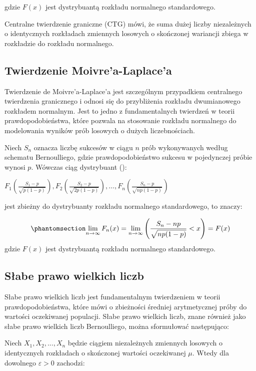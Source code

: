 \documentclass[
  letterpaper,
  DIV=11,
  numbers=noendperiod]{scrreprt}
\begin{document}
gdzie \(F(x)\) jest dystrybuantą rozkładu normalnego standardowego.

Centralne twierdzenie graniczne (CTG) mówi, że suma dużej liczby
niezależnych o identycznych rozkładach zmiennych losowych o skończonej
wariancji zbiega w rozkładzie do rozkładu normalnego.

\subsection{Twierdzenie
Moivre'a-Laplace'a}\label{twierdzenie-moivrea-laplacea}

Twierdzenie de Moivre'a-Laplace'a jest szczególnym przypadkiem
centralnego twierdzenia granicznego i odnosi się do przybliżenia
rozkładu dwumianowego rozkładem normalnym. Jest to jedno z
fundamentalnych twierdzeń w teorii prawdopodobieństwa, które pozwala na
stosowanie rozkładu normalnego do modelowania wyników prób losowych o
dużych liczebnościach.

Niech \(S_n\) oznacza liczbę sukcesów w ciągu \(n\) prób wykonywanych
według schematu Bernoulliego, gdzie prawdopodobieństwo sukcesu w
pojedynczej próbie wynosi \(p\). Wówczas ciąg dystrybuant
():

\(F_1\left(\frac{S_1-p}{\sqrt{p(1-p)}}\right), F_2\left(\frac{S_2-p}{\sqrt{2p(1-p)}}\right), \ldots, F_n\left(\frac{S_n-p}{\sqrt{np(1-p)}}\right)\)

jest zbieżny do dystrybuanty rozkładu normalnego standardowego, to
znaczy:

\begin{equation}\phantomsection\label{eq-ML}{\lim_{n \to \infty}F_n(x) = \lim_{n \to \infty} \left( \frac{S_n-np}{\sqrt{np(1-p)}} <x \right) = F(x)}\end{equation}
gdzie \(F(x)\) jest dystrybuantą rozkładu normalnego standardowego.

\subsection{Słabe prawo wielkich
liczb}\label{sux142abe-prawo-wielkich-liczb}

Słabe prawo wielkich liczb jest fundamentalnym twierdzeniem w teorii
prawdopodobieństwa, które mówi o zbieżności średniej arytmetycznej próby
do wartości oczekiwanej populacji. Słabe prawo wielkich liczb, znane
również jako słabe prawo wielkich liczb Bernoulliego, można sformułować
następująco:

Niech \(X_1, X_2, ..., X_n\) będzie ciągiem niezależnych zmiennych
losowych o identycznych rozkładach o skończonej wartości oczekiwanej
\(\mu\). Wtedy dla dowolnego \(\varepsilon > 0\) zachodzi:
\end{document}
